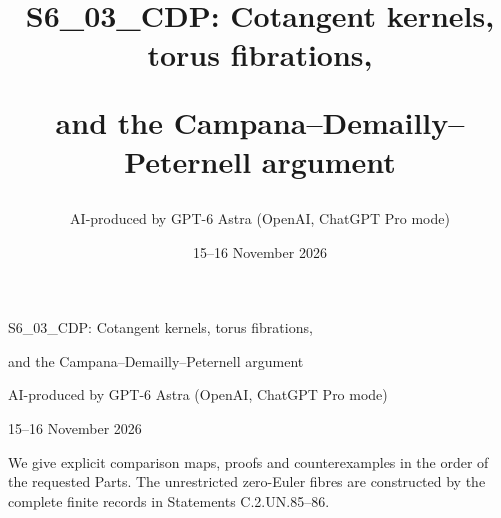 \documentclass[11pt,a4paper]{article}
\title{S6\_03\_CDP: Cotangent kernels, torus fibrations,\par and the Campana--Demailly--Peternell argument}
\author{AI-produced by GPT-6 Astra (OpenAI, ChatGPT Pro mode)}
\date{15--16 November 2026}
\theoremstyle{definition}
\begin{document}
\begin{center}
{\Large S6\_03\_CDP: Cotangent kernels, torus fibrations,\par
and the Campana--Demailly--Peternell argument}\par\medskip
AI-produced by GPT-6 Astra (OpenAI, ChatGPT Pro mode)\par
15--16 November 2026
\end{center}
\noindent We give explicit comparison maps, proofs and counterexamples in the
order of the requested Parts. The unrestricted zero-Euler fibres are
constructed by the complete finite records in Statements C.2.UN.85--86.
{\small}
\clearpage
\tableofcontents







\end{document}
